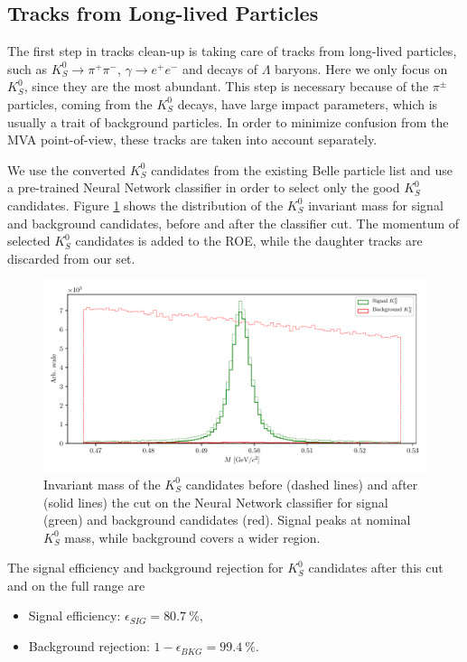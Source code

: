 \subsection{Tracks from Long-lived Particles}

The first step in tracks clean-up is taking care of tracks from long-lived particles, such as $K_S^0 \to \pi^+\pi^-$, $\gamma \to e^+ e^-$ and decays of $\Lambda$ baryons. Here we only focus on $K_S^0$, since they are the most abundant. This step is necessary because of the $\pi^\pm$ particles, coming from the $K_S^0$ decays, have large impact parameters, which is usually a trait of background particles. In order to minimize confusion from the MVA point-of-view, these tracks are taken into account separately.

We use the converted $K_S^0$ candidates from the existing Belle particle list and use a pre-trained Neural Network classifier in order to select only the good $K_S^0$ candidates. Figure \ref{fig:ROE_V0} shows the distribution of the $K_S^0$ invariant mass for signal and background candidates, before and after the classifier cut. The momentum of selected $K_S^0$ candidates is added to the ROE, while the daughter tracks are discarded from our set.

\begin{figure}[H]
	\centering
	\captionsetup{width=0.8\linewidth}
	\includegraphics[width=\linewidth]{fig/ROECleanup_V0}
	\caption{Invariant mass of the $K_S^0$ candidates before (dashed lines) and after (solid lines) the cut on the Neural Network classifier for signal (green) and background candidates (red). Signal peaks at nominal $K_S^0$ mass, while background covers a wider region.}
	\label{fig:ROE_V0}
\end{figure}

The signal efficiency and background rejection for $K_S^0$ candidates after this cut and on the full range are
\begin{itemize}
	\item Signal efficiency: $\epsilon_{SIG} = 80.7~\%$,
	\item Background rejection: $1-\epsilon_{BKG} = 99.4~\%$.
\end{itemize}

